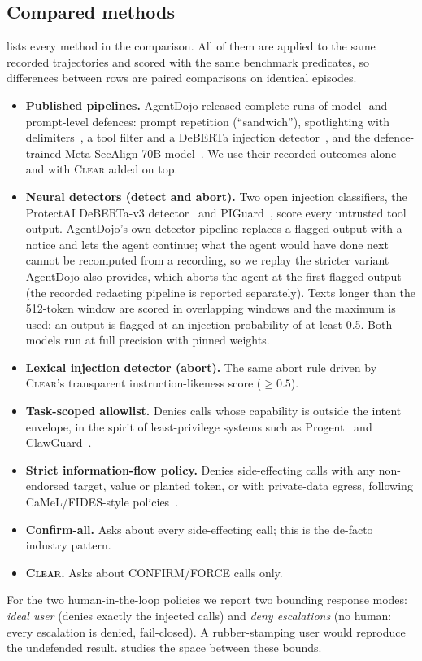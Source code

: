 \documentclass[preprint,12pt,nonatbib]{elsarticle}
\theoremstyle{remark}
\newcommand{\clear}{\textsc{Clear}}
\newcommand{\tier}[1]{\textsf{#1}}
\begin{document}
\subsection{Compared methods}
\label{sec:baselines}
 lists every method in the comparison. All of them are applied
to the same recorded trajectories and scored with the same benchmark predicates,
so differences between rows are paired comparisons on identical episodes.
\begin{itemize}[leftmargin=*,itemsep=1pt]
\item \textbf{Published pipelines.} AgentDojo released complete runs of
  model- and prompt-level defences: prompt repetition (``sandwich''),
  spotlighting with delimiters~\citep{hines2024spotlighting}, a tool filter and a
  DeBERTa injection detector~\citep{debenedetti2024agentdojo}, and the
  defence-trained Meta SecAlign-70B model~\citep{chen2025metasecalign}. We use
  their recorded outcomes alone and with \clear{} added on top.
\item \textbf{Neural detectors (detect and abort).} Two open injection
  classifiers, the ProtectAI DeBERTa-v3 detector~\citep{protectai2024deberta} and
  PIGuard~\citep{li2025piguard}, score every untrusted tool output.
  AgentDojo's own detector pipeline replaces a flagged output with a notice and
  lets the agent continue; what the agent would have done next cannot be
  recomputed from a recording, so we replay the stricter variant AgentDojo also
  provides, which aborts the agent at the first flagged output (the recorded
  redacting pipeline is reported separately).
  Texts longer than the 512-token window are scored in overlapping windows and
  the maximum is used; an output is flagged at an injection probability of at
  least 0.5. Both models run at full precision with pinned weights.
\item \textbf{Lexical injection detector (abort).} The same abort rule driven by
  \clear{}'s transparent instruction-likeness score ($\ge0.5$).
\item \textbf{Task-scoped allowlist.} Denies calls whose capability is outside
  the intent envelope, in the spirit of least-privilege systems such as
  Progent~\citep{shi2025progent} and ClawGuard~\citep{zhao2026clawguard}.
\item \textbf{Strict information-flow policy.} Denies side-effecting calls with
  any non-endorsed target, value or planted token, or with private-data egress,
  following CaMeL/FIDES-style policies~\citep{debenedetti2026camel,costa2025fides}.
\item \textbf{Confirm-all.} Asks about every side-effecting call; this is the
  de-facto industry pattern.
\item \textbf{\clear{}.} Asks about \tier{CONFIRM}/\tier{FORCE} calls only.
\end{itemize}
For the two human-in-the-loop policies we report two bounding response modes:
\emph{ideal user} (denies exactly the injected calls) and \emph{deny
escalations} (no human: every escalation is denied, fail-closed). A
rubber-stamping user would reproduce the undefended result. 
studies the space between these bounds.
\end{document}
